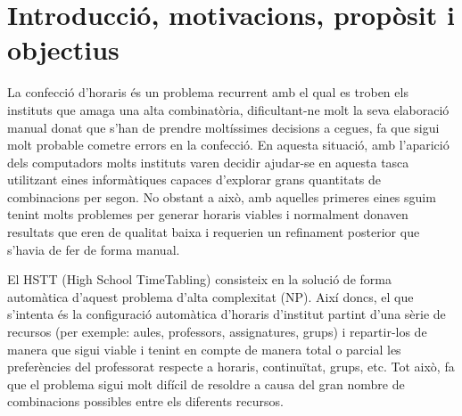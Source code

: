 \documentclass[11pt,a4paper,twoside]{report}
\begin{document}
  \begin{titlepage}
    
  \end{titlepage}


  \shipout\null
  \tableofcontents
  
  \chapter{Introducció, motivacions, propòsit i objectius}
  

  La confecció d'horaris és un problema recurrent amb el qual es troben els instituts que amaga una alta combinatòria, 
  dificultant-ne molt la seva elaboració manual donat que s'han de prendre moltíssimes decisions a cegues,
  fa que sigui molt probable cometre errors en la confecció. En aquesta situació, amb l'aparició dels computadors molts instituts varen decidir ajudar-se en aquesta tasca utilitzant eines informàtiques capaces 
  d'explorar grans quantitats de combinacions per segon. No obstant a això, 
  amb aquelles primeres eines sguim tenint molts problemes per generar horaris viables i normalment donaven resultats que
   eren de qualitat baixa i requerien un refinament posterior que s'havia de fer de forma manual.
  
  El HSTT (High School TimeTabling) consisteix en la solució de forma automàtica d'aquest problema d'alta complexitat (NP). 
  Així doncs, el que s'intenta és la configuració automàtica d'horaris d'institut partint d'una sèrie de recursos 
  (per exemple: aules, professors, assignatures, grups) i repartir-los de manera que sigui viable i tenint en compte 
  de manera total o parcial les preferències del professorat respecte a horaris, continuïtat, grups, etc. 
  Tot això, fa que el problema sigui molt difícil de resoldre a causa del gran nombre de combinacions possibles entre els diferents recursos.
  
\end{document}
